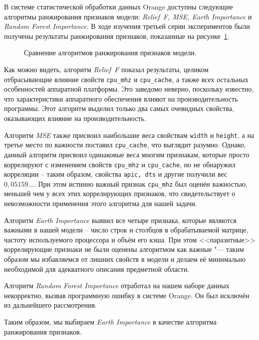В системе статистической обработки данных Orange доступны следующие алгоритмы ранжирования признаков модели: \textit{Relief~F, MSE, Earth Importance} и \textit{Random Forest Importance}. В ходе изучения третьей серии экспериментов были получены результаты ранжирования признаков, показанные на рисунке~\ref{img:ranking-full}.

\begin{figure}[tbp]
    \caption{Сравнение алгоритмов ранжирования признаков модели.}
    \label{img:ranking-full}
\end{figure}

Как можно видеть, алгоритм \textit{Relief~F} показал результаты, целиком отбрасывающие влияние свойств \texttt{cpu_mhz} и \texttt{cpu_cache}, а также всех остальных особенностей аппаратной платформы. Это заведомо неверно, поскольку известно, что характеристики аппаратного обеспечения влияют на производительность программы. Этот алгоритм выделил только два самых очевидных свойства, оказывающих влияние на производительность.

Алгоритм \textit{MSE} также присвоил наибольшие веса свойствам \texttt{width} и \texttt{height}, а на третье место по важности поставил \texttt{cpu_cache}, что выглядит разумно. Однако, данный алгоритм присвоил одинаковые веса многим признакам, которые просто коррелируют с изменением свойств \texttt{cpu_mhz} и \texttt{cpu_cache}, но не обнаружил корреляции -- таким образом, свойства \texttt{apic, dts} и другие получили вес $0,05159...$. При этом истинно важный признак \texttt{cpu_mhz} был оценён важностью, меньшей чем у всех этих коррелирующих признаков, что свидетельствует о невозможности применения этого алгоритма для нашей задачи.

Алгоритм \textit{Earth Importance} выявил все четыре признака, которые являются важными в нашей модели -- число строк и столбцов в обрабатываемой матрице, частоту используемого процессора и объём его кэша. При этом <<паразитные>> коррелирующие признаки не были оценены алгоритмом как важные "--- таким образом мы избавляемся от лишних свойств в модели и делаем её минимально необходимой для адекватного описания предметной области.

Алгоритм \textit{Random Forest Importance} отработал на нашем наборе данных некорректно, вызвав программную ошибку в системе Orange. Он был исключён из дальнейшего рассмотрения.

Таким образом, мы выбираем \textit{Earth Importance} в качестве алгоритма ранжирования признаков.

